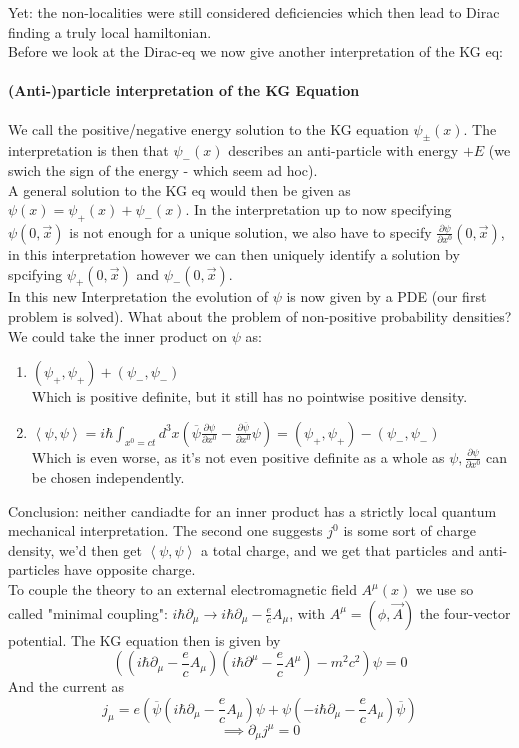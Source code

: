 \documentclass{report}
\begin{document}
Yet: the non-localities were still considered deficiencies which then lead to Dirac finding a truly local hamiltonian.\\
Before we look at the Dirac-eq we now give another interpretation of the KG eq:\\
\paragraph{(Anti-)particle interpretation of the KG Equation}
We call the positive/negative energy solution to the KG equation $\psi_{\pm}\left( x \right) $. The interpretation is then that $\psi_-\left( x \right) $ describes an anti-particle with energy $+E$ (we swich the sign of the energy - which seem ad hoc).\\
A general solution to the KG eq would then be given as  $\psi(x) = \psi_+\left( x \right) + \psi_-\left( x \right) $. In the interpretation up to now specifying $\psi\left( 0,\vec{x} \right) $ is not enough for a unique solution, we also have to specify $\frac{\partial \psi}{\partial x^0 }\left( 0, \vec{x} \right) $, in this interpretation however we can then uniquely identify a solution by spcifying $\psi_+\left( 0, \vec{x} \right) $ and $\psi_-\left( 0, \vec{x} \right) $. \\
In this new Interpretation the evolution of $\psi$ is now given by a PDE (our first problem is solved). What about the problem of non-positive probability densities? We could take the inner product on $\psi$ as:
\begin{enumerate}
  \item $\left( \psi_+, \psi_+ \right) + \left( \psi_-, \psi_- \right) $\\
    Which is positive definite, but it still has no pointwise positive density.
  \item $\left<\psi, \psi\right> = i\hbar \int_{x^0=ct} d^3x \left( \overline{\psi} \frac{\partial \psi}{\partial x^0} - \frac{\partial \overline{\psi} }{\partial x^0} \psi \right) = \left( \psi_+, \psi_+ \right) - \left( \psi_-, \psi_- \right)  $\\
    Which is even worse, as it's not even positive definite as a whole as $\psi, \frac{\partial \psi}{\partial x^0}$ can be chosen independently. 
\end{enumerate}
Conclusion: neither candiadte for an inner product has a strictly local quantum mechanical interpretation. The second one suggests $j^0$ is some sort of charge density, we'd then get $\left<\psi,\psi\right>$ a total charge, and we get that particles and anti-particles have opposite charge.\\
To couple the theory to an external electromagnetic field $A^\mu\left( x \right) $ we use so called "minimal coupling": $i\hbar\partial_\mu \to i\hbar\partial_\mu - \frac{e}{c} A_\mu  $, with $A^\mu = \left( \phi, \vec{A} \right) $ the four-vector potential. The KG equation then is given by \[
  \left( \left( i\hbar\partial_\mu -\frac{e}{c}A_\mu  \right) \left( i\hbar\partial^\mu - \frac{e}{c}A^\mu  \right) - m^2c^2 \right) \psi = 0
\] And the current as \[
j_\mu = e \left( \overline{\psi} \left( i\hbar \partial_\mu - \frac{e}{c}A_\mu  \right) \psi + \psi \left( -i\hbar\partial_\mu - \frac{e}{c} A_\mu  \right) \overline{\psi} \right) 
\] \[
\implies \partial_\mu j^\mu = 0 
\] 
\end{document}
